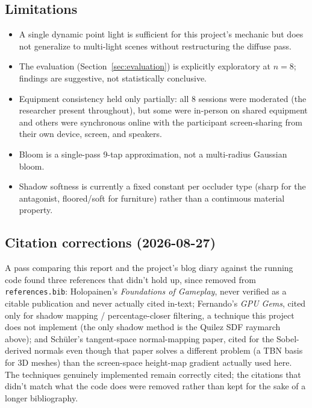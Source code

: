 \documentclass[conference]{IEEEtran}
\begin{document}
\subsection{Limitations}
\begin{itemize}
  \item A single dynamic point light is sufficient for this project's mechanic but does not generalize to multi-light scenes without restructuring the diffuse pass.
  \item The evaluation (Section~\ref{sec:evaluation}) is explicitly exploratory at $n=8$; findings are suggestive, not statistically conclusive.
  \item Equipment consistency held only partially: all 8 sessions were moderated (the researcher present throughout), but some were in-person on shared equipment and others were synchronous online with the participant screen-sharing from their own device, screen, and speakers.
  \item Bloom is a single-pass 9-tap approximation, not a multi-radius Gaussian bloom.
  \item Shadow softness is currently a fixed constant per occluder type (sharp for the antagonist, floored/soft for furniture) rather than a continuous material property.
\end{itemize}

\subsection{Citation corrections (2026-08-27)}
A pass comparing this report and the project's blog diary against the running code found three references that didn't hold up, since removed from \texttt{references.bib}: Holopainen's \emph{Foundations of Gameplay}, never verified as a citable publication and never actually cited in-text; Fernando's \emph{GPU Gems}, cited only for shadow mapping / percentage-closer filtering, a technique this project does not implement (the only shadow method is the Quilez SDF raymarch above); and Schüler's tangent-space normal-mapping paper, cited for the Sobel-derived normals even though that paper solves a different problem (a TBN basis for 3D meshes) than the screen-space height-map gradient actually used here. The techniques genuinely implemented remain correctly cited; the citations that didn't match what the code does were removed rather than kept for the sake of a longer bibliography.
\end{document}
